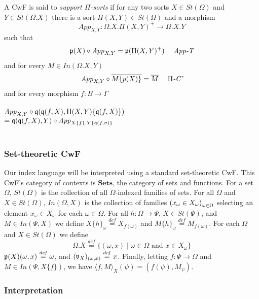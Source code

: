 \documentclass[sigplan,10pt,review,anonymous]{acmart}
\newcommand{\defeq}{\overset{\mathit{def}}{=}}
\newcommand{\mbf}[1]{\mathbf{#1}}
\newcommand{\fm}[2]{
\left(
\tiny
#1
\normalsize
\right)_{#2}
}
\begin{document}
A CwF is said to \emph{support $\Pi$-sorts} if for any two sorts $X \in \mathit{St}(\Omega)$ and $Y \in \mathit{St}(\Omega.X)$ there is a sort $\Pi(X,Y) \in \mathit{St}(\Omega)$ and a morphism $$\mathit{App}_{X,Y} : \Omega . X . \Pi(X,Y)^+ \to \Omega . X . Y$$ such that $$\frak p(X) \circ \mathit{App}_{X,Y} = \frak p(\Pi(X,Y)^+) \hspace{3.0ex} \textit{App-T}$$
and for every $M \in \mathit{In}(\Omega.X, Y)$
$$\mathit{App}_{X,Y} \circ \overline{M \{ p(X) \}} = \overline{M} \hspace{3.0ex} \Pi\textit{-C'}$$
and for every morphism $f : B \to \Gamma$\\~\\
$\mathit{App}_{X,Y} \circ \frak q( \frak q(f, X), \Pi(X,Y)\{ \frak q (f, X) \})$\\ 
$= \frak q(\frak q (f, X), Y) \circ \mathit{App}_{X \{ f \}, Y \{ \frak q(f, \sigma) \}}$\\~\\

\subsubsection{Set-theoretic CwF}

Our index language will be interpreted using a standard set-theoretic CwF. This CwF's category of contexts is $\mbf{Sets}$, the category of sets and functions. For a set $\Omega$, $\mathit{St}(\Omega)$ is the collection of all $\Omega$-indexed families of sets. For all $\Omega$ and $X \in \mathit{St}(\Omega)$, $\mathit{In}(\Omega,X)$ is the collection of families $\fm{x_\omega \in X_\omega}{\omega \in \Omega}$ selecting an element $x_\omega \in X_\omega$ for each $\omega \in \Omega$. For all $h : \Omega \to \Psi$, $X \in \mathit{St}(\Psi)$, and $M \in \mathit{In}(\Psi,X)$ we define $X \{ h \}_{\omega} \defeq X_{f(\omega)}$ and $M \{ h \}_\omega \defeq M_{f(\omega)}$. For each $\Omega$ and $X \in \mathit{St}(\Omega)$ we define $$\Omega . X \defeq \{ (\omega,x) \mid \omega \in \Omega \text{ and } x \in X_\omega \}$$ $\frak p (X)(\omega,x) \defeq \omega$, and $(\frak v_{X})_{(\omega,x)} \defeq x$. Finally, letting $f : \Psi \to \Omega$ and $M \in \mathit{In}(\Psi, X \{ f \})$, we have $\langle f, M \rangle_X(\psi) = (f(\psi), M_{\psi})$.

\subsubsection{Interpretation}
\end{document}

